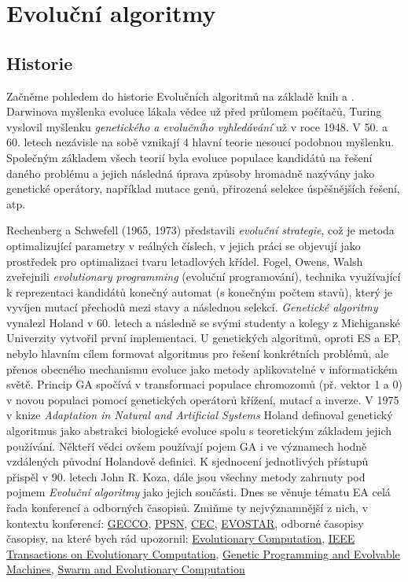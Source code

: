\chapter{Evoluční algoritmy}
\section{Historie}
Začněme pohledem do historie Evolučních algoritmů na základě knih \cite{MitchellBook} a \cite{eibenIntro}. Darwinova myšlenka evoluce lákala vědce už před průlomem počítačů, Turing vyslovil myšlenku \textit{genetického a evolučního vyhledávání} už v roce 1948. V 50. a 60. letech nezávisle na sobě vznikají 4 hlavní teorie nesoucí podobnou myšlenku. Společným základem všech teorií byla evoluce populace kandidátů na řešení daného problému a jejich následná úprava způsoby hromadně nazývány jako genetické operátory, například mutace genů, přirozená selekce úspěšnějších řešení, atp.
\par 
Rechenberg a Schwefell (1965, 1973) představili \textit{evoluční strategie}, což je metoda optimalizující parametry v reálných číslech, v jejich práci se objevují jako prostředek pro optimalizaci tvaru letadlových křídel. Fogel, Owens, Walsh zveřejnili \textit{evolutionary programming} (evoluční programování), technika využívající k reprezentaci kandidátů konečný automat (s konečným počtem stavů), který je vyvíjen mutací přechodů mezi stavy a následnou selekcí. \textit{Genetické algoritmy} vynalezl Holand v 60. letech a následně se svými studenty a kolegy z Michiganské Univerzity vytvořil první implementaci. U genetických algoritmů, oproti ES a EP, nebylo hlavním cílem formovat algoritmus pro řešení konkrétních problémů, ale přenos obecného mechanismu evoluce jako metody aplikovatelné v informatickém světě. Princip GA spočívá v transformaci populace chromozomů (př. vektor 1 a 0) v novou populaci pomocí genetických operátorů křížení, mutací a inverze. V 1975 v knize \textit{Adaptation in Natural and  Artificial Systems} \citep{HolandBook} Holand definoval genetický algoritmus jako abstrakci biologické evoluce spolu s teoretickým základem jejich používání. Někteří vědci ovšem používají pojem GA i ve významech hodně vzdálených původní Holandově definici. K sjednocení jednotlivých přístupů přispěl v 90. letech John R. Koza, dále jsou všechny metody zahrnuty pod pojmem \textit{Evoluční algoritmy} jako jejich součásti. Dnes se věnuje tématu EA celá řada konferencí a odborných časopisů. Zmiňme ty nejvýznamnější z nich, v kontextu konferencí: 
\href{http://gecco-2017.sigevo.org/index.html/HomePage}{GECCO}, \href{http://www.ppsn2016.org/conference}{PPSN}, 
\href{http://www.cec2017.org/}{CEC}, 
\href{http://www.evostar.org/2018/}{EVOSTAR}, 
odborné časopisy časopisy, na které bych rád upozornil: 
\href{http://www.mitpressjournals.org/loi/evco}{Evolutionary Computation}, 
\href{http://ieeexplore.ieee.org/xpl/RecentIssue.jsp?reload=true&punumber=4235}{IEEE Transactions on Evolutionary Computation}, 
\href{http://www.springer.com/computer/ai/journal/10710}{Genetic Programming and Evolvable Machines},
\href{https://www.journals.elsevier.com/swarm-and-evolutionary-computation/}{Swarm and Evolutionary Computation}


